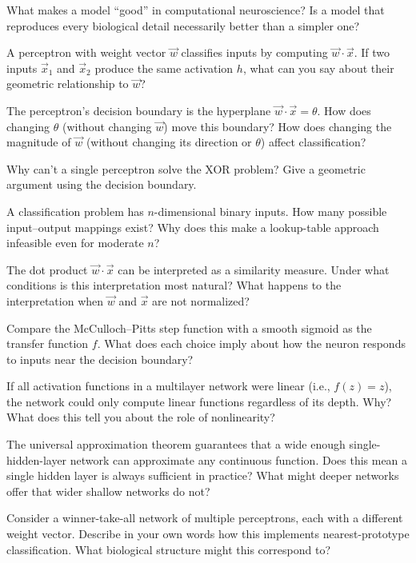 \begin{conceptquestions}
  \item What makes a model ``good'' in computational neuroscience? Is a model that reproduces every biological detail necessarily better than a simpler one?

  \item A perceptron with weight vector $\vec{w}$ classifies inputs by computing $\vec{w} \cdot \vec{x}$. If two inputs $\vec{x}_1$ and $\vec{x}_2$ produce the same activation $h$, what can you say about their geometric relationship to $\vec{w}$?

  \item The perceptron's decision boundary is the hyperplane $\vec{w} \cdot \vec{x} = \theta$. How does changing $\theta$ (without changing $\vec{w}$) move this boundary? How does changing the magnitude of $\vec{w}$ (without changing its direction or $\theta$) affect classification?

  \item Why can't a single perceptron solve the XOR problem? Give a geometric argument using the decision boundary.

  \item A classification problem has $n$-dimensional binary inputs. How many possible input--output mappings exist? Why does this make a lookup-table approach infeasible even for moderate $n$?

  \item The dot product $\vec{w} \cdot \vec{x}$ can be interpreted as a similarity measure. Under what conditions is this interpretation most natural? What happens to the interpretation when $\vec{w}$ and $\vec{x}$ are not normalized?

  \item Compare the McCulloch--Pitts step function with a smooth sigmoid as the transfer function $f$. What does each choice imply about how the neuron responds to inputs near the decision boundary?

  \item If all activation functions in a multilayer network were linear (i.e., $f(z) = z$), the network could only compute linear functions regardless of its depth. Why? What does this tell you about the role of nonlinearity?

  \item The universal approximation theorem guarantees that a wide enough single-hidden-layer network can approximate any continuous function. Does this mean a single hidden layer is always sufficient in practice? What might deeper networks offer that wider shallow networks do not?

  \item Consider a winner-take-all network of multiple perceptrons, each with a different weight vector. Describe in your own words how this implements nearest-prototype classification. What biological structure might this correspond to?
\end{conceptquestions}
